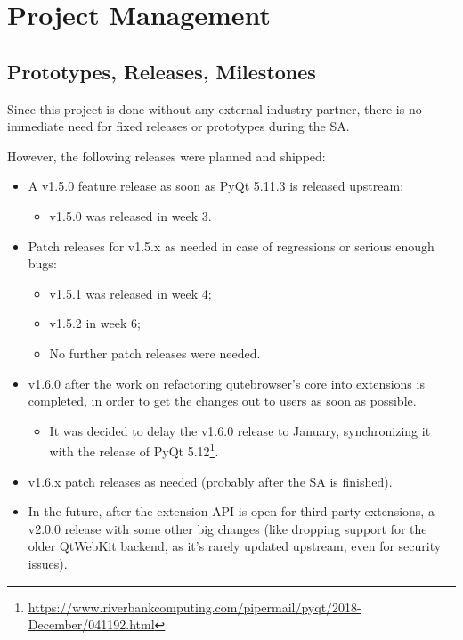 
\chapter{Project Management}
\label{ch:projectman}

\section{Prototypes, Releases, Milestones}

Since this project is done without any external industry partner, there is no
immediate need for fixed releases or prototypes during the SA.

However, the following releases were planned and shipped:

\begin{itemize}
  \item A v1.5.0 feature release as soon as PyQt 5.11.3 is released upstream:
    \begin{itemize}
      \item v1.5.0 was released in week 3.
    \end{itemize}
  \item Patch releases for v1.5.x as needed in case of regressions or serious
    enough bugs:
    \begin{itemize}
      \item v1.5.1 was released in week 4;
      \item v1.5.2 in week 6;
      \item No further patch releases were needed.
    \end{itemize}
  \item v1.6.0 after the work on refactoring qutebrowser's core into extensions
    is completed, in order to get the changes out to users as soon as possible.
    \begin{itemize}
      \item It was decided to delay the v1.6.0 release to January, synchronizing
        it with the release of PyQt
        5.12\footnote{\url{https://www.riverbankcomputing.com/pipermail/pyqt/2018-December/041192.html}}.
    \end{itemize}
  \item v1.6.x patch releases as needed (probably after the SA is finished).
  \item In the future, after the extension API is open for third-party
    extensions, a v2.0.0 release with some other big changes (like dropping support
    for the older QtWebKit backend, as it's rarely updated upstream, even for
    security issues).
\end{itemize}


